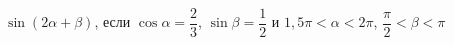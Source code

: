 \begin{ex}[type=simplify_calculate]
	\begin{condition}
		\( \sin(2\alpha+\beta) \), \quad если \( \cos\alpha=\dfrac{2}{3} \), \( \sin\beta=\dfrac{1}{2} \) и \( 1,5\pi<\alpha<2\pi \), \( \dfrac{\pi}{2}<\beta<\pi \)
	\end{condition}
\end{ex}